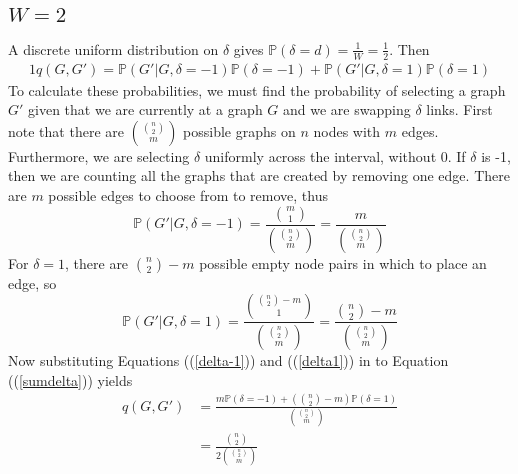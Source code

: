 \documentclass[12pt,a4paper]{article}
\let\oldref\ref
\renewcommand{\ref}[1]{(\oldref{#1})}
\theoremstyle{definition}
\renewcommand{\P}{\mathbb{P}}
\newcommand{\lchoose}[2]{\binom{#1}{#2}}
\begin{document}
\subsection{\(W=2\)}
A discrete uniform distribution on \(\delta\) gives \(\P(\delta=d)=\frac{1}{W}=\frac{1}{2}\). Then
    \begin{alignat}{1}\label{sumdelta}
q(G,G')= \P(G'|G,\delta=-1)\P(\delta=-1)+\P(G'|G,\delta=1)\P(\delta=1)
\end{alignat}
To calculate these probabilities, we must find the probability of selecting a graph \(G'\) given that we are currently at a graph \(G\) and we are swapping \(\delta\) links. First note that there are \(\binom{\lchoose{n}{2}}{m}\) possible graphs on \(n\) nodes with \(m\) edges. Furthermore, we are selecting \(\delta\) uniformly across the interval, without 0. If \(\delta\) is -1, then we are counting all the graphs that are created by removing one edge. There are \(m\) possible edges to choose from to remove, thus
\begin{equation}\label{delta-1}\P(G'|G,\delta=-1)=\frac{\lchoose{m}{1}}{\binom{\lchoose{n}{2}}{m}}=\frac{m}{\binom{\lchoose{n}{2}}{m}}\end{equation}
For \(\delta=1\), there are \(\lchoose{n}{2}-m\) possible empty node pairs in which to place an edge, so
\begin{equation}\label{delta1}    \P(G'|G,\delta=1)=\frac{\binom{\lchoose{n}{2}-m}{1}}{\binom{\lchoose{n}{2}}{m}}=\frac{\binom{n}{2}-m}{\binom{\lchoose{n}{2}}{m}}\end{equation}
Now substituting Equations (\ref{delta-1}) and (\ref{delta1}) in to Equation (\ref{sumdelta}) yields
\begin{align*} 
q(G,G')
&=\frac{m\P(\delta=-1)+(\lchoose{n}{2}-m)\P(\delta=1)}{\binom{\lchoose{n}{2}}{m}}\\[0.4em]
&=\frac{\lchoose{n}{2}}{2\binom{\lchoose{n}{2}}{m}}\\
\end{align*}
\end{document}
